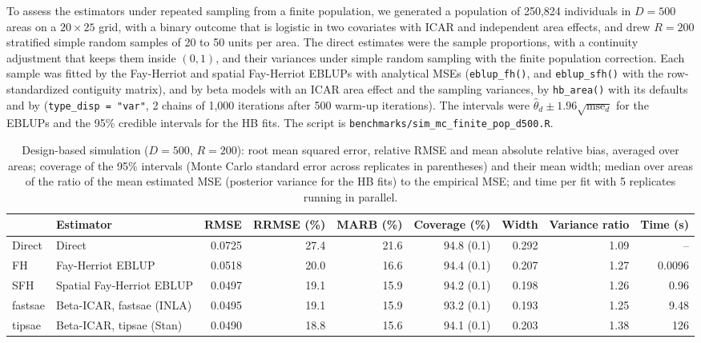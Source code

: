 To assess the estimators under repeated sampling from a finite population, we generated a population of 250,824 individuals in \(D = 500\) areas on a \(20 \times 25\) grid, with a binary outcome that is logistic in two covariates with ICAR and independent area effects, and drew \(R = 200\) stratified simple random samples of 20 to 50 units per area. The direct estimates were the sample proportions, with a continuity adjustment that keeps them inside \((0, 1)\), and their variances under simple random sampling with the finite population correction. Each sample was fitted by the Fay-Herriot and spatial Fay-Herriot EBLUPs with analytical MSEs (\texttt{eblup\_fh()}, and \texttt{eblup\_sfh()} with the row-standardized contiguity matrix), and by beta models with an ICAR area effect and the sampling variances, by \texttt{hb\_area()} with its defaults and by  (\texttt{type\_disp\ =\ "var"}, 2 chains of 1,000 iterations after 500 warm-up iterations). The intervals were \(\hat{\theta}_d \pm 1.96\sqrt{\mathrm{mse}_d}\) for the EBLUPs and the 95\% credible intervals for the HB fits. The script is \texttt{benchmarks/sim\_mc\_finite\_pop\_d500.R}.

\begin{table}[!h]
\centering
\caption{\label{tab:mc}Design-based simulation ($D = 500$, $R = 200$): root mean squared error, relative RMSE and mean absolute relative bias, averaged over areas; coverage of the 95\% intervals (Monte Carlo standard error across replicates in parentheses) and their mean width; median over areas of the ratio of the mean estimated MSE (posterior variance for the HB fits) to the empirical MSE; and time per fit with 5 replicates running in parallel.}
\centering
\fontsize{9}{11}\selectfont
\begin{tabular}[t]{llrrrrrrr}
\toprule
  & Estimator & RMSE & RRMSE (\%) & MARB (\%) & Coverage (\%) & Width & Variance ratio & Time (s)\\
\midrule
Direct & Direct & 0.0725 & 27.4 & 21.6 & 94.8 (0.1) & 0.292 & 1.09 & --\\
FH & Fay-Herriot EBLUP & 0.0518 & 20.0 & 16.6 & 94.4 (0.1) & 0.207 & 1.27 & 0.0096\\
SFH & Spatial Fay-Herriot EBLUP & 0.0497 & 19.1 & 15.9 & 94.2 (0.1) & 0.198 & 1.26 & 0.96\\
fastsae & Beta-ICAR, fastsae (INLA) & 0.0495 & 19.1 & 15.9 & 93.2 (0.1) & 0.193 & 1.25 & 9.48\\
tipsae & Beta-ICAR, tipsae (Stan) & 0.0490 & 18.8 & 15.6 & 94.1 (0.1) & 0.203 & 1.38 & 126\\
\bottomrule
\end{tabular}
\end{table}

